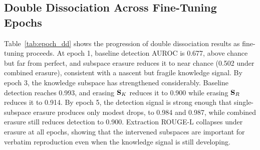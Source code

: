 \subsection{Double Dissociation Across Fine-Tuning Epochs}
\label{app:epoch_dd}

\begin{table}[!htbp]
\centering
\caption{Double dissociation for Pythia-1B at epochs 1, 3, and 5.
At epoch 1, baseline detection is weak and erasure effects are minimal.
By epoch 3, the knowledge subspace carries sufficient signal for erasure to produce measurable drops.
Extraction ROUGE-L collapses under erasure at all epochs.}
\label{tab:epoch_dd}
\end{table}

Table~\ref{tab:epoch_dd} shows the progression of double dissociation results as fine-tuning proceeds.
At epoch 1, baseline detection AUROC is 0.677, above chance but far from perfect, and subspace erasure reduces it to near chance (0.502 under combined erasure), consistent with a nascent but fragile knowledge signal.
By epoch 3, the knowledge subspace has strengthened considerably. Baseline detection reaches 0.993, and erasing $\mathbf{S}_K$ reduces it to 0.900 while erasing $\mathbf{S}_R$ reduces it to 0.914.
By epoch 5, the detection signal is strong enough that single-subspace erasure produces only modest drops, to 0.984 and 0.987, while combined erasure still reduces detection to 0.900.
Extraction ROUGE-L collapses under erasure at all epochs, showing that the intervened subspaces are important for verbatim reproduction even when the knowledge signal is still developing.

